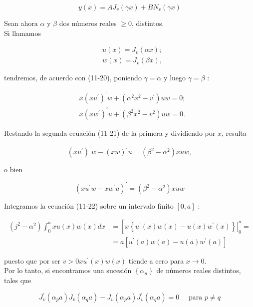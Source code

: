 \documentclass[10pt]{article}
\theoremstyle{plain}
\theoremstyle{definition}
\theoremstyle{remark}
\begin{document}
$$
y(x)=A J_{v}(\gamma x)+B N_{v}(\gamma x)
$$

Sean ahora $\alpha$ y $\beta$ dos números reales $\geqslant 0$, distintos.\\
Si llamamos

$$
\begin{aligned}
& u(x)=J_{v}(\alpha x) ; \\
& w(x)=J_{v}(\beta x),
\end{aligned}
$$

tendremos, de acuerdo con (11-20), poniendo $\gamma=\alpha$ y luego $\gamma=\beta$ :


\begin{align*}
& x\left(x u^{\prime}\right)^{\prime} w+\left(\alpha^{2} x^{2}-v^{\prime}\right) u w=0 ;  \tag{11-21}\\
& x\left(x w^{\prime}\right)^{\prime} u+\left(\beta^{2} x^{2}-v^{2}\right) u w=0 .
\end{align*}


Restando la segunda ecuación (11-21) de la primera y dividiendo por $x$, resulta

$$
\left(x u^{\prime}\right)^{\prime} w-(x w)^{\prime} u=\left(\beta^{2}-\alpha^{2}\right) x u w,
$$


o bien


\begin{equation*}
\left(x u^{\prime} w-x w^{\prime} u\right)^{\prime}=\left(\beta^{2}-\alpha^{2}\right) x u w \tag{$11\cdot22$}
\end{equation*}


Integramos la ecuación (11-22) sobre un intervalo fínito $[0, a]$ :


\begin{align*}
\left(j^{2}-\alpha^{2}\right) \int_{0}^{a} x u(x) w(x) d x & =\left[\left.x\left\{u^{\prime}(x) w(x)-u(x) w^{\prime}(x)\right\}\right|_{0} ^{a}=\right. \\
& =a\left[u^{\prime}(a) w(a)-u(a) w^{\prime}(a)\right] \tag{11.23}
\end{align*}


puesto que por ser $v>0 x u^{\prime}(x) w(x)$ tiende a cero para $x \rightarrow 0$.\\
Por lo tanto, si encontramos una sucesión $\left\{\alpha_{n}\right\}$ de números reales distintos, tales que

$$
J_{v}^{\prime}\left(\alpha_{p} a\right) J_{v}\left(\alpha_{q} a\right)-J_{v}\left(\alpha_{p} a\right) J_{v}^{\prime}\left(\alpha_{q} a\right)=0 \quad \text { para } p \neq q
$$
\end{document}
